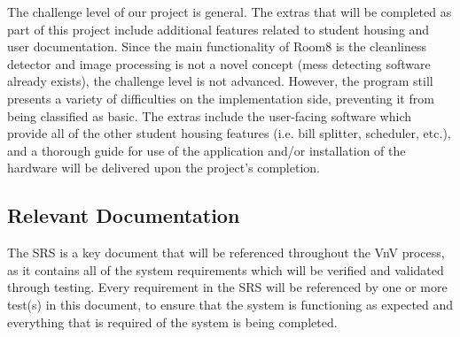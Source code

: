 \documentclass[12pt, titlepage]{article}
\begin{document}

The challenge level of our project is general. The extras that will be completed as part of this project include additional features related to student housing and user documentation. Since the main functionality of Room8 is the cleanliness detector and  image processing is not a novel concept (mess detecting software already exists), the challenge level is not advanced. However, the program still presents a variety of difficulties on the implementation side, preventing it from being classified as basic. The extras include the user-facing software which provide all of the other student housing features (i.e. bill splitter, scheduler, etc.), and a thorough guide for use of the application and/or installation of the hardware will be delivered upon the project's completion. 

\subsection{Relevant Documentation}


\cite{SRS}


The SRS is a key document that will be referenced throughout the VnV process, as it contains all of the system requirements which will be verified and validated through testing. Every requirement in the SRS will be referenced by one or more test(s) in this document, to ensure that the system is functioning as expected and everything that is required of the system is being completed.
\end{document}
